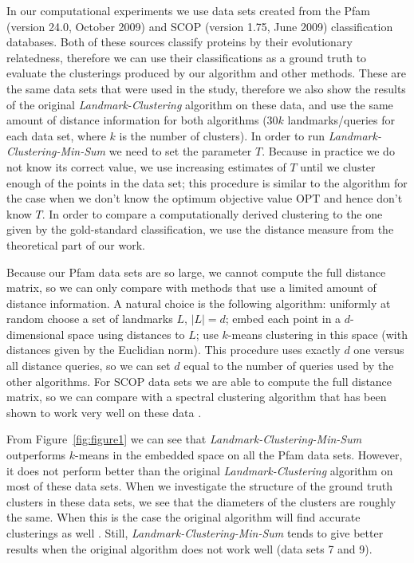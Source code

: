 \documentclass{llncs} \usepackage{algorithm}
\newcommand{\OPT}{\mathrm{OPT}}
\begin{document}
In our computational experiments we use data sets created from the Pfam \cite{pfam} (version 24.0, October 2009) and SCOP \cite{scop} (version 1.75, June 2009) classification databases.  Both of these sources classify proteins by their evolutionary relatedness, therefore we can use their classifications as a ground truth to evaluate the clusterings produced by our algorithm and other methods.  These are the same data sets that were used in the \cite{vbrtx} study, therefore we also show the results of the original \emph{Landmark-Clustering} algorithm on these data, and use the same amount of distance information for both algorithms ($30k$ landmarks/queries for each data set, where $k$ is the number of clusters).  In order to run \emph{Landmark-Clustering-Min-Sum} we need to set the parameter $T$.  Because in practice we do not know its correct value, we use increasing estimates of $T$ until we cluster enough of the points in the data set; this procedure is similar to the algorithm for the case when we don't know the optimum objective value $\OPT$ and hence don't know $T$. In order to compare a computationally derived clustering to the one given by the gold-standard classification, we use the distance measure from the theoretical part of our work.


Because our Pfam data sets are so large, we cannot compute the full distance matrix, so we can only compare with methods that use a limited amount of distance information.  A natural choice is the following algorithm: uniformly at random choose a set of landmarks $L$, $\vert L \vert = d$; embed each point in a $d$-dimensional space using distances to $L$; use $k$-means clustering in this space (with distances given by the Euclidian norm).  This procedure uses exactly $d$ one versus all distance queries, so we can set $d$ equal to the number of queries used by the other algorithms.  For SCOP data sets we are able to compute the full distance matrix, so we can compare with a spectral clustering algorithm that has been shown to work very well on these data \cite{spectralClusteringProteinSeqs}.

From Figure~\ref{fig:figure1} we can see that \emph{Landmark-Clustering-Min-Sum} outperforms $k$-means in the embedded space on all the Pfam data sets.  However, it does not perform better than the original \emph{Landmark-Clustering} algorithm on most of these data sets.  When we investigate the structure of the ground truth clusters in these data sets, we see that the diameters of the clusters are roughly the same.  When this is the case the original algorithm will find accurate clusterings as well \cite{vbrtx}.  Still, \emph{Landmark-Clustering-Min-Sum} tends to give better results when the original algorithm does not work well (data sets 7 and 9).
\end{document}
